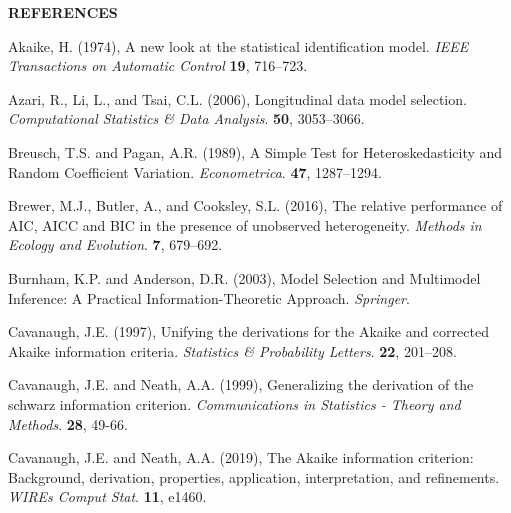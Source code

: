 
\begin{center}
\textbf{REFERENCES}
\end{center}
\singlespace

\phantom{a}

\phantom{a}

\rff Akaike, H. (1974),
      A new look at the statistical identification model.
     {\it IEEE Transactions on Automatic Control}
     {\bf 19}, {716--723}.

\phantom{a}

\rff Azari, R., Li, L., and Tsai, C.L. (2006),
      Longitudinal data model selection.
      {\it Computational Statistics \& Data Analysis}.
      {\bf 50}, {3053--3066}.

\phantom{a}

\rff Breusch, T.S. and Pagan, A.R. (1989),
      A Simple Test for Heteroskedasticity and Random Coefficient Variation.
      {\it Econometrica}.
      {\bf 47}, {1287--1294}.

\phantom{a}

\rff Brewer, M.J., Butler, A., and Cooksley, S.L. (2016),
      The relative performance of AIC, AICC and BIC in the presence of unobserved heterogeneity.
      {\it Methods in Ecology and Evolution}.
      {\bf 7}, {679--692}.

\phantom{a}

\rff Burnham, K.P. and Anderson, D.R. (2003),
      Model Selection and Multimodel Inference: A Practical Information-Theoretic Approach.
      {\it Springer}.

\phantom{a}

\rff Cavanaugh, J.E. (1997),
      Unifying the derivations for the Akaike and corrected Akaike information criteria.
      {\it Statistics \& Probability Letters}.
      {\bf 22}, {201--208}.

\phantom{a}

\rff Cavanaugh, J.E. and Neath, A.A. (1999),
      Generalizing the derivation of the schwarz information criterion.
      {\it Communications in Statistics - Theory and Methods}.
      {\bf 28}, {49-66}.

\phantom{a}

\rff Cavanaugh, J.E. and Neath, A.A. (2019),
      The Akaike information criterion: Background, derivation, properties, application, interpretation, and refinements.
      {\it WIREs Comput Stat}.
      {\bf 11}, {e1460}.

